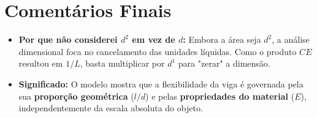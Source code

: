 \section*{Comentários Finais}
\begin{itemize}
    \item \textbf{Por que não considerei $d^2$ em vez de $d$:} Embora a área seja $d^2$, a análise dimensional foca no cancelamento das unidades líquidas. Como o produto $CE$ resultou em $1/L$, basta multiplicar por $d^1$ para "zerar" a dimensão.
    \item \textbf{Significado:} O modelo mostra que a flexibilidade da viga é governada pela sua \textbf{proporção geométrica} ($l/d$) e pelas \textbf{propriedades do material} ($E$), independentemente da escala absoluta do objeto.
\end{itemize}
\fi